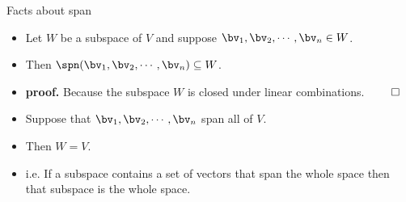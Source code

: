 \documentclass{beamer}
\begin{document}
\begin{frame}{Facts about span}

\begin{itemize}
\item Let $W$ be a subspace of $V$ and suppose $\bv_1,\bv_2,\cdots,\bv_n\in W$.\
\item Then $\spn(\bv_1,\bv_2,\cdots,\bv_n)\subseteq W$.
\item \textbf{proof.} Because the subspace $W$ is closed under linear combinations. $\qed$
\item Suppose that $\bv_1,\bv_2,\cdots,\bv_n$ span all of $V$.
\item Then $W=V$.
\item i.e. If a subspace contains a set of vectors that span the whole space then
that subspace is the whole space.
\end{itemize}

\end{frame}


\end{document}
